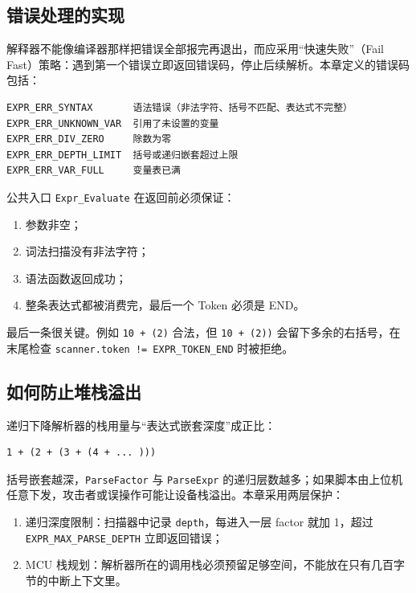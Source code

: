 \subsection{错误处理的实现}

解释器不能像编译器那样把错误全部报完再退出，而应采用“快速失败”（Fail Fast）策略：遇到第一个错误立即返回错误码，停止后续解析。本章定义的错误码包括：

\begin{lstlisting}
EXPR_ERR_SYNTAX       语法错误（非法字符、括号不匹配、表达式不完整）
EXPR_ERR_UNKNOWN_VAR  引用了未设置的变量
EXPR_ERR_DIV_ZERO     除数为零
EXPR_ERR_DEPTH_LIMIT  括号或递归嵌套超过上限
EXPR_ERR_VAR_FULL     变量表已满
\end{lstlisting}

公共入口 \texttt{Expr\_Evaluate} 在返回前必须保证：

\begin{enumerate}
\item 参数非空；
\item 词法扫描没有非法字符；
\item 语法函数返回成功；
\item 整条表达式都被消费完，最后一个 Token 必须是 END。
\end{enumerate}

最后一条很关键。例如 \texttt{10 + (2)} 合法，但 \texttt{10 + (2))} 会留下多余的右括号，在末尾检查 \texttt{scanner.token != EXPR\_TOKEN\_END} 时被拒绝。

\subsection{如何防止堆栈溢出}

递归下降解析器的栈用量与“表达式嵌套深度”成正比：

\begin{lstlisting}
1 + (2 + (3 + (4 + ... )))
\end{lstlisting}

括号嵌套越深，\texttt{ParseFactor} 与 \texttt{ParseExpr} 的递归层数越多；如果脚本由上位机任意下发，攻击者或误操作可能让设备栈溢出。本章采用两层保护：

\begin{enumerate}
\item 递归深度限制：扫描器中记录 \texttt{depth}，每进入一层 factor 就加 1，超过 \texttt{EXPR\_MAX\_PARSE\_DEPTH} 立即返回错误；
\item MCU 栈规划：解析器所在的调用栈必须预留足够空间，不能放在只有几百字节的中断上下文里。
\end{enumerate}

